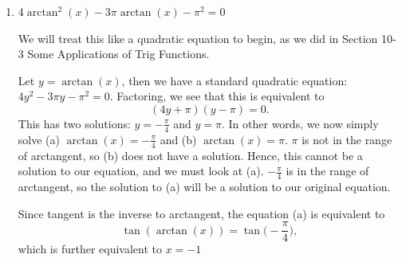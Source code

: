\documentclass{ximera}
\begin{document}
\begin{example}
\begin{enumerate}
\begin{explanation}
{\bf But, wait! }

Remember, we had to restrict the domain of tangent in order to define an inverse function, which we called arctangent. Arctangent is the inverse of the {\it restricted} tangent function, whose domain is $\Big(\!-\frac{\pi}{2},\frac{\pi}{2}\Big)$. $\frac{5\pi}{3}$ is larger than $\frac{\pi}{2}$, so it is not within the domain of this restricted tangent function. 

Thus, we begin by simplifying $\tan\!\Big(\frac{5\pi}{3}\Big) = -\sqrt{3}$. 

Now, let's consider $\arctan(-\sqrt{3})$, recalling again the {\it range} of arctangent. We are looking for the value of $y$ in $\Big(\!-\frac{\pi}{2},\frac{\pi}{2}\Big)$ such that $\tan(y) =-\sqrt{3}$.

Hence, $y$ is $-\frac{\pi}{3}$, and we now see that 
\begin{equation*}
\arctan\!\Big(\!\tan\!\Big(\frac{5\pi}{3}\Big)\Big) = \arctan(-\sqrt{3}) = -\frac{\pi}{3}.
\end{equation*}

[graph for arctangent?]

\end{explanation}


\item $4\arctan^2(x) - 3\pi \arctan(x) - \pi^2 = 0$\\
\begin{explanation}
	We will treat this like a quadratic equation to begin, as we did in Section 10-3 Some Applications of Trig Functions. 

Let $y = \arctan(x)$, then we have a standard quadratic equation: $4y^2- 3\pi y - \pi^2=0$. Factoring, we see that this is equivalent to 
$$(4y +\pi)(y-\pi)=0.$$
%
This has two solutions: $y = -\frac{\pi}{4}$ and $y=\pi$. In other words, we now simply solve (a) $\arctan(x) = -\frac{\pi}{4}$ and (b) $\arctan(x) = \pi$. $\pi$ is not in the range of arctangent, so (b) does not have a solution. Hence, this cannot be a solution to our equation, and we must look at (a). $-\frac{\pi}{4}$ is in the range of arctangent, so the solution to (a) will be a solution to our original equation.

Since tangent is the inverse to arctangent, the equation (a) is equivalent to $$\tan(\arctan(x))=\tan\!\Big(\!-\frac{\pi}{4}\Big),$$
which is further equivalent to $x=-1$
\end{explanation}
\end{enumerate}
\end{example}
\end{document}
